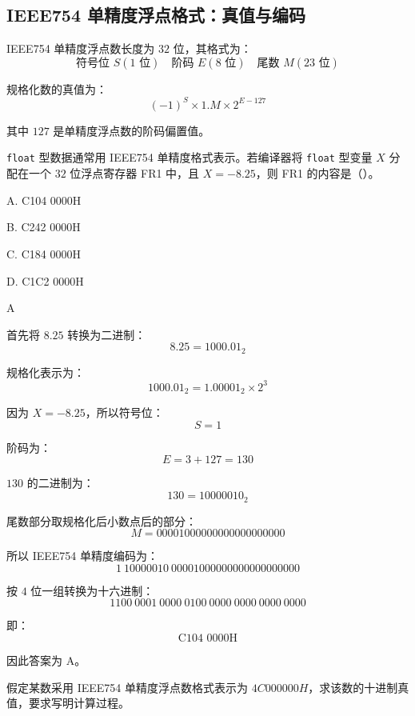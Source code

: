 \subsection{IEEE754 单精度浮点格式：真值与编码}

\begin{knowledge}
IEEE754 单精度浮点数长度为 $32$ 位，其格式为：
\[
\text{符号位 }S(1\text{ 位}) \quad
\text{阶码 }E(8\text{ 位}) \quad
\text{尾数 }M(23\text{ 位})
\]

规格化数的真值为：
\[
(-1)^S \times 1.M \times 2^{E-127}
\]

其中 $127$ 是单精度浮点数的阶码偏置值。
\end{knowledge}


\begin{question}
\texttt{float} 型数据通常用 IEEE754 单精度格式表示。若编译器将 \texttt{float} 型变量 $X$ 分配在一个 $32$ 位浮点寄存器 FR1 中，且 $X=-8.25$，则 FR1 的内容是（）。

A. C104 0000H

B. C242 0000H

C. C184 0000H

D. C1C2 0000H
\end{question}

\begin{answer}
A
\end{answer}

\begin{analysisenv}
首先将 $8.25$ 转换为二进制：
\[
8.25 = 1000.01_2
\]

规格化表示为：
\[
1000.01_2 = 1.00001_2 \times 2^3
\]

因为 $X=-8.25$，所以符号位：
\[
S=1
\]

阶码为：
\[
E = 3 + 127 = 130
\]

$130$ 的二进制为：
\[
130 = 10000010_2
\]

尾数部分取规格化后小数点后的部分：
\[
M = 00001000000000000000000
\]

所以 IEEE754 单精度编码为：
\[
1\ 10000010\ 00001000000000000000000
\]

按 $4$ 位一组转换为十六进制：
\[
1100\ 0001\ 0000\ 0100\ 0000\ 0000\ 0000\ 0000
\]

即：
\[
\text{C104 0000H}
\]

因此答案为 A。
\end{analysisenv}


\begin{question}
假定某数采用 IEEE754 单精度浮点数格式表示为 $4C000000H$，求该数的十进制真值，要求写明计算过程。
\end{question}

